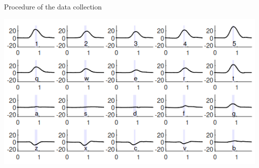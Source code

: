 \documentclass[ucs,9pt,usenames,dvipsnames]{beamer}
\begin{document}
\begin{frame}{Procedure of the data collection}
\begin{minipage}[c]{0.49\linewidth}
\end{minipage}
\begin{minipage}[c]{0.49\linewidth}
	\includegraphics[width=\textwidth]{imgs/mobicom}
\end{minipage}


\end{frame}
\end{document}
